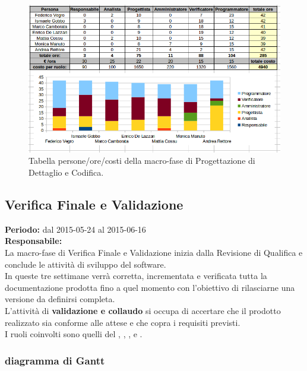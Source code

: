 \begin{figure}[h]
\begin{center}
\includegraphics[scale=0.50]{img/progdet-personeorecosti.png}
\caption{Tabella persone/ore/costi della macro-fase di Progettazione di Dettaglio e Codifica.}
\end{center}
\end{figure}

\newpage
\subsection{Verifica Finale e Validazione}
\textbf{Periodo:} dal 2015-05-24 al 2015-06-16 \\
\textbf{Responsabile:} \CaMa \\
La macro-fase di Verifica Finale e Validazione inizia dalla Revisione di Qualifica e conclude le attività di sviluppo del software. \\
In queste tre settimane verrà corretta, incrementata e verificata tutta la documentazione prodotta fino a quel momento con l'obiettivo di rilasciarne una versione da definirsi completa. \\
L'attività di \textbf{validazione e collaudo} si occupa di accertare che il prodotto realizzato sia conforme alle attese e che copra i requisiti previsti. \\
I ruoli coinvolti sono quelli del \ruoloResponsabile{}, \ruoloAmministratore{}, \ruoloProgettista{}, \ruoloVerificatore{} e \ruoloProgrammatore{}. \\

\newpage
\subsubsection{diagramma di Gantt}

